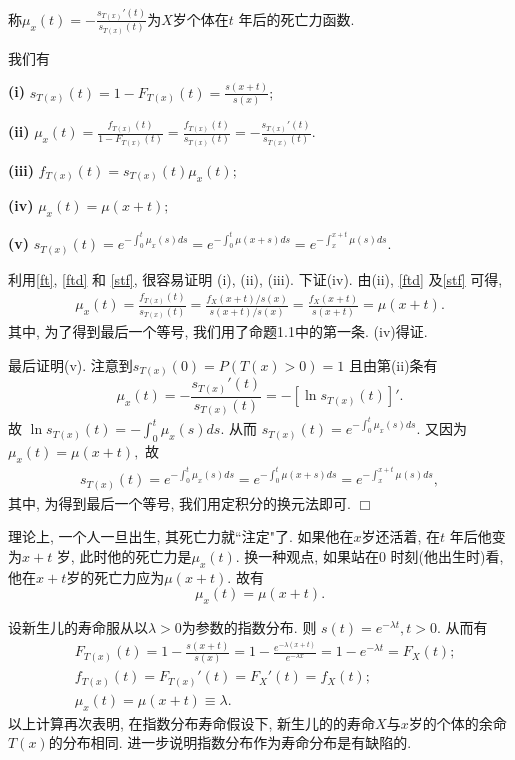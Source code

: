 \documentclass[a4paper,openany, 10pt]{ctexbook}
\def\qed{\hfill$\Box$\medskip}
\begin{document}
\begin{definition}
    称$\mu_x(t) = -\frac{s_{T(x)}'(t)}{s_{T(x)}(t)}$为$X$岁个体在$t$ 年后的死亡力函数.
\end{definition}

\begin{proposition}\label{p21} 我们有

    {\bf(i)} $s_{T(x)}(t)=1-F_{T(x)}(t)=\frac{s(x+t)}{s(x)};$

    {\bf(ii)} $\mu_{x}(t)=\frac{f_{T(x)}(t)}{1-F_{T(x)}(t)}=\frac{f_{T(x)}(t)}{s_{T(x)}(t)}=-\frac{s_{T(x)}'(t)}{s_{T(x)}(t)}.$

    {\bf(iii)} $f_{T(x)}(t)=s_{T(x)}(t)\mu_{x}(t);$

    {\bf(iv)} $\mu_x(t)=\mu(x+t);$

    {\bf(v)} $s_{T(x)}(t)=e^{-\int_0^t \mu_x(s)ds}=e^{-\int_0^t \mu(x+s)ds}=e^{-\int_x^{x+t} \mu(s)ds}.$

\end{proposition}
\proof 利用\eqref{ft}, \eqref{ftd} 和 \eqref{stf}, 很容易证明 (i), (ii), (iii). 下证(iv). 由(ii), \eqref{ftd} 及\eqref{stf} 可得,
\begin{align*}
    \mu_{x}(t)=\frac{f_{T(x)}(t)}{s_{T(x)}(t)}=\frac{f_{X}(x+t)/s(x)}{s(x+t)/s(x)}=\frac{f_{X}(x+t)}{s(x+t)}=\mu(x+t).
\end{align*}
其中, 为了得到最后一个等号, 我们用了命题1.1中的第一条. (iv)得证.

最后证明(v). 注意到$s_{T(x)}(0)=P(T(x)>0)=1$ 且由第(ii)条有
$$\mu_{x}(t)=-\frac{s_{T(x)}'(t)}{s_{T(x)}(t)}=-[\ln s_{T(x)}(t)]'.$$
故 $\ln s_{T(x)}(t)=-\int_0^t\mu_x(s)ds.$ 从而
$s_{T(x)}(t)=e^{-\int_0^t\mu_x(s)ds}.$ 又因为$\mu_x(t)=\mu(x+t),$ 故
\begin{align*}
    s_{T(x)}(t)=e^{-\int_0^t\mu_x(s)ds}=e^{-\int_0^t\mu(x+s)ds}=e^{-\int_x^{x+t} \mu(s)ds},
\end{align*}
其中, 为得到最后一个等号, 我们用定积分的换元法即可. \qed


\begin{remark}
    理论上, 一个人一旦出生, 其死亡力就``注定"了. 如果他在$x$岁还活着, 在$t$ 年后他变为$x+t$ 岁, 此时他的死亡力是$\mu_x(t).$ 换一种观点, 如果站在0 时刻(他出生时)看, 他在$x+t$岁的死亡力应为$\mu(x+t).$ 故有
    $$\mu_x(t)=\mu(x+t).$$
\end{remark}

\begin{example}
    设新生儿的寿命服从以$\lambda>0$为参数的指数分布. 则
    $s(t)=e^{-\lambda t}, t>0.$ 从而有
    \begin{align*}
         & F_{T(x)}(t)=1-\frac{s(x+t)}{s(x)}=1-\frac{e^{-\lambda(x+t)}}{e^{-\lambda x}}=1-e^{-\lambda t} =F_X(t); \\
         & f_{T(x)}(t)=F_{T(x)}'(t)=F_X'(t)=f_X(t);                                                               \\
         & \mu_x(t)=\mu(x+t)\equiv\lambda.
    \end{align*}
    以上计算再次表明, 在指数分布寿命假设下, 新生儿的的寿命$X$与$x$岁的个体的余命$T(x)$的分布相同. 进一步说明指数分布作为寿命分布是有缺陷的.
\end{example}
\end{document}
